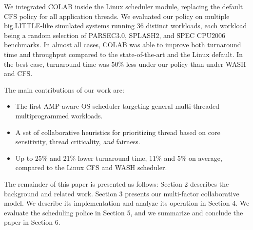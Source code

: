 We integrated COLAB inside the Linux scheduler module, replacing the default CFS policy for all application threads. We evaluated our policy on multiple big.LITTLE-like simulated systems running 36 distinct workloads, each workload being a random selection of PARSEC3.0, SPLASH2, and SPEC CPU2006 benchmarks. In almost all cases, COLAB was able to improve both turnaround time and throughput compared to the state-of-the-art and the Linux default. In the best case, turnaround time was 50\% less under our policy than under WASH and CFS.


The main contributions of our work are:
\begin{itemize}
\item The first AMP-aware OS scheduler targeting general multi-threaded multiprogrammed workloads.
\item A set of collaborative heuristics for prioritizing thread based on core sensitivity, thread criticality, \emph{and} fairness.
\item Up to 25\% and 21\% lower turnaround time, 11\% and 5\% on average, compared to the Linux CFS and WASH scheduler.
\end{itemize}

The remainder of this paper is presented as follows: Section 2 describes the background and related work. Section 3 presents our multi-factor collaborative model. We describe its implementation and analyze its operation in Section 4. We evaluate the scheduling police in Section 5, and we summarize and conclude the paper in Section 6.  
